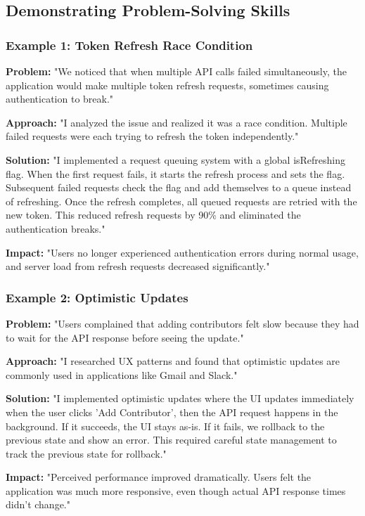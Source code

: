 \documentclass[11pt,a4paper]{article}
\begin{document}
\subsection{Demonstrating Problem-Solving Skills}

\subsubsection{Example 1: Token Refresh Race Condition}
\textbf{Problem:} "We noticed that when multiple API calls failed simultaneously, the application would make multiple token refresh requests, sometimes causing authentication to break."

\textbf{Approach:} "I analyzed the issue and realized it was a race condition. Multiple failed requests were each trying to refresh the token independently."

\textbf{Solution:} "I implemented a request queuing system with a global isRefreshing flag. When the first request fails, it starts the refresh process and sets the flag. Subsequent failed requests check the flag and add themselves to a queue instead of refreshing. Once the refresh completes, all queued requests are retried with the new token. This reduced refresh requests by 90\% and eliminated the authentication breaks."

\textbf{Impact:} "Users no longer experienced authentication errors during normal usage, and server load from refresh requests decreased significantly."

\subsubsection{Example 2: Optimistic Updates}
\textbf{Problem:} "Users complained that adding contributors felt slow because they had to wait for the API response before seeing the update."

\textbf{Approach:} "I researched UX patterns and found that optimistic updates are commonly used in applications like Gmail and Slack."

\textbf{Solution:} "I implemented optimistic updates where the UI updates immediately when the user clicks 'Add Contributor', then the API request happens in the background. If it succeeds, the UI stays as-is. If it fails, we rollback to the previous state and show an error. This required careful state management to track the previous state for rollback."

\textbf{Impact:} "Perceived performance improved dramatically. Users felt the application was much more responsive, even though actual API response times didn't change."
\end{document}
